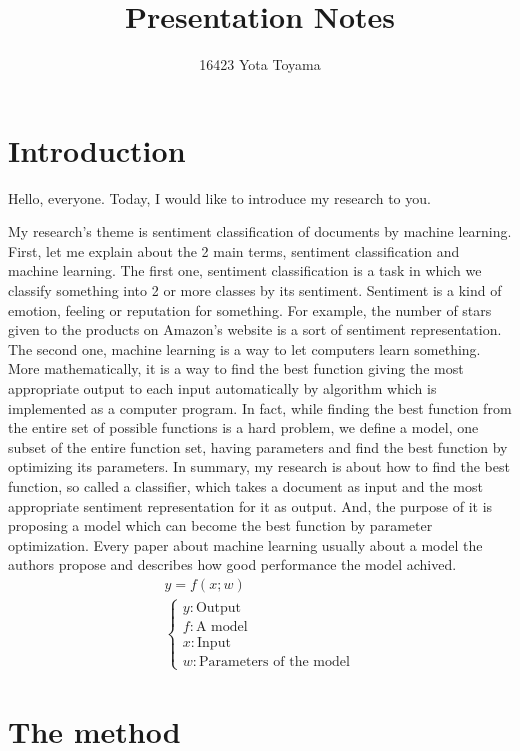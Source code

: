 \documentclass{notes}
\title{Presentation Notes}
\author{16423 Yota Toyama}
\date{}
\begin{document}
\maketitle


\section{Introduction}

Hello, everyone.
Today, I would like to introduce my research to you.

My research's theme is sentiment classification of documents
by machine learning.
First, let me explain about the 2 main terms, sentiment classification
and machine learning.
The first one, sentiment classification is a task
in which we classify something into 2 or more classes by its sentiment.
Sentiment is a kind of emotion, feeling or reputation for something.
For example, the number of stars given to the products on Amazon's website
is a sort of sentiment representation.
The second one, machine learning is a way to let computers learn something.
More mathematically, it is a way to find the best function
giving the most appropriate output to each input automatically by algorithm
which is implemented as a computer program.
In fact, while finding the best function from the entire set
of possible functions is a hard problem, we define a model,
one subset of the entire function set, having parameters
and find the best function by optimizing its parameters.
In summary, my research is about how to find the best function,
so called a classifier, which takes a document as input
and the most appropriate sentiment representation for it as output.
And, the purpose of it is proposing a model which can become the best function
by parameter optimization.
Every paper about machine learning usually about a model the authors propose
and describes how good performance the model achived.
\begin{gather*}
  y = f(x; w) \\
  \begin{cases}
    y : \text{Output} \\
    f : \text{A model} \\
    x : \text{Input} \\
    w : \text{Parameters of the model}
  \end{cases}
\end{gather*}


\section{The method}
\end{document}
